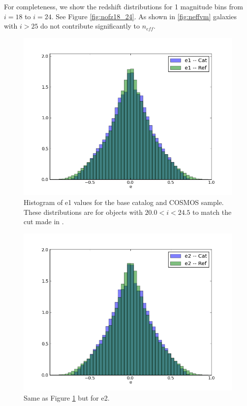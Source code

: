 \documentclass[]{article}
\begin{document}
For completeness, we show the redshift distributions for 1 magnitude bins from $i=18$ to $i=24$.  See Figure \ref{fig:nofz18_24}.  As shown in \ref{fig:neffvm}
galaxies with $i > 25$ do not contribute significantly to $n_{eff}$. 
\begin{figure}
\centering
\includegraphics[width=5in]{validation_figures/e1_hist.png}
\caption{Histogram of e1 values for the base catalog and COSMOS sample.  These distributions are for objects with $20.0 < i < 24.5$ to match
the cut made in \cite{chang}.\label{fig:ellip1}}
\end{figure}
\begin{figure}
\centering
\includegraphics[width=5in]{validation_figures/e2_hist.png}
\caption{Same as Figure \ref{fig:ellip1} but for e2.\label{fig:ellip2}}
\end{figure}
\end{document}

